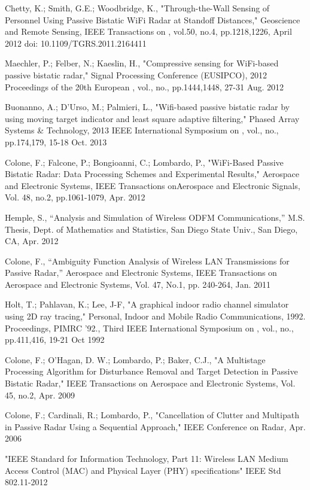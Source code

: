 \documentclass[article,11pt,onecolumn,final]{IEEEtran}
\begin{document}
\begin{thebibliography}{100}

 Chetty, K.; Smith, G.E.; Woodbridge, K., "Through-the-Wall Sensing of Personnel Using Passive
Bistatic WiFi Radar at Standoff Distances," Geoscience and Remote Sensing, IEEE Transactions on ,
vol.50, no.4, pp.1218,1226, April 2012
doi: 10.1109/TGRS.2011.2164411

 Maechler, P.; Felber, N.; Kaeslin, H., "Compressive sensing for WiFi-based passive bistatic radar,"
Signal Processing Conference (EUSIPCO), 2012 Proceedings of the 20th European , vol., no.,
pp.1444,1448, 27-31 Aug. 2012

 Buonanno, A.; D'Urso, M.; Palmieri, L., "Wifi-based passive bistatic radar by using moving target
indicator and least square adaptive filtering," Phased Array Systems \& Technology, 2013 IEEE
International Symposium on , vol., no., pp.174,179, 15-18 Oct. 2013

 Colone, F.; Falcone, P.; Bongioanni, C.; Lombardo, P., "WiFi-Based Passive Bistatic Radar: Data
Processing Schemes and Experimental Results," Aerospace and Electronic Systems, IEEE Transactions
onAerospace and Electronic Signals, Vol. 48, no.2, pp.1061-1079, Apr. 2012

 Hemple, S., “Analysis and Simulation of Wireless ODFM Communications,” M.S. Thesis, Dept. of
Mathematics and Statistics, San Diego State Univ., San Diego, CA, Apr. 2012

 Colone, F., “Ambiguity Function Analysis of Wireless LAN Transmissions for Passive Radar,”
Aerospace and Electronic Systems, IEEE Transactions on Aerospace and Electronic Systems, Vol. 47, No.1,
pp. 240-264, Jan. 2011

 Holt, T.; Pahlavan, K.; Lee, J-F, "A graphical indoor radio channel simulator using 2D ray tracing," Personal, Indoor and Mobile Radio Communications, 1992. Proceedings, PIMRC '92., Third IEEE International Symposium on , vol., no., pp.411,416, 19-21 Oct 1992

 Colone, F.; O'Hagan, D. W.; Lombardo, P.; Baker, C.J., "A Multistage Processing Algorithm for Disturbance Removal and Target Detection in Passive Bistatic Radar," IEEE Transactions on Aerospace and Electronic Systems, Vol. 45, no.2, Apr. 2009

 Colone, F.; Cardinali, R.; Lombardo, P., "Cancellation of Clutter and Multipath in Passive Radar Using a Sequential Approach," IEEE Conference on Radar, Apr. 2006

\bibitem "IEEE Standard for Information Technology, Part 11: Wireless LAN Medium Access Control (MAC) and Physical Layer (PHY) specifications" IEEE Std 802.11-2012


\end{thebibliography}
\end{document}
